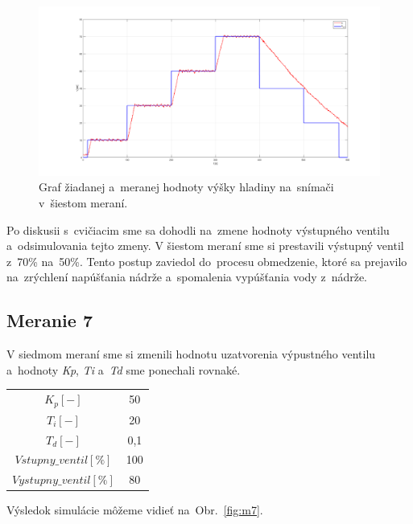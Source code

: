 \documentclass{article}
\begin{document}
\begin{figure}[!htbp]
	\begin{center}
		\includegraphics[width=\textwidth]{./include/meranie6.png}
	\end{center}
	\caption{Graf žiadanej a~meranej hodnoty výšky hladiny na~snímači v~šiestom meraní.}
	\label{fig:m6}
\end{figure}

Po diskusii s~cvičiacim sme sa dohodli na~zmene hodnoty výstupného ventilu a~odsimulovania tejto zmeny.
V šiestom meraní sme si prestavili výstupný ventil z~70\% na~50\%. Tento postup zaviedol do~procesu
obmedzenie, ktoré sa prejavilo na~zrýchlení napúšťania nádrže a~spomalenia vypúšťania vody z~nádrže.

\clearpage

\subsection{Meranie 7}
\label{sec:meranie7}

V siedmom meraní sme si zmenili hodnotu uzatvorenia výpustného ventilu a~hodnoty \textit{Kp}, \textit{Ti}
a~\textit{Td} sme ponechali rovnaké.

\begin{center}
\begin{tabular}{ |c|c| }
 \hline
 $K_p [-]$ & 50 \\
 $T_i [-]$ & 20 \\
 $T_d [-]$ & 0,1 \\
 \hline
 $Vstupny\_ventil[\%]$ & 100 \\
 $Vystupny\_ventil[\%]$ & 80 \\
 \hline
\end{tabular}
\end{center}

Výsledok simulácie môžeme vidieť na~Obr.~\ref{fig:m7}.
\end{document}

